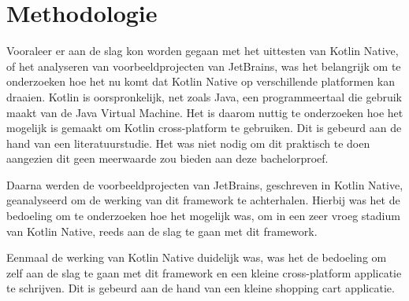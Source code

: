 
\chapter{Methodologie}
\label{ch:methodologie}


Vooraleer er aan de slag kon worden gegaan met het uittesten van Kotlin Native, of het analyseren van voorbeeldprojecten van JetBrains, was het belangrijk om te onderzoeken hoe het nu komt dat Kotlin Native op verschillende platformen kan draaien. Kotlin is oorspronkelijk, net zoals Java, een programmeertaal die gebruik maakt van de Java Virtual Machine. Het is daarom nuttig te onderzoeken hoe het mogelijk is gemaakt om Kotlin cross-platform te gebruiken. Dit is gebeurd aan de hand van een literatuurstudie. Het was niet nodig om dit praktisch te doen aangezien dit geen meerwaarde zou bieden aan deze bachelorproef.

Daarna werden de voorbeeldprojecten van JetBrains, geschreven in Kotlin Native, geanalyseerd om de werking van dit framework te achterhalen. Hierbij was het de bedoeling om te onderzoeken hoe het mogelijk was, om in een zeer vroeg stadium van Kotlin Native, reeds aan de slag te gaan met dit framework. 

Eenmaal de werking van Kotlin Native duidelijk was, was het de bedoeling om zelf aan de slag te gaan met dit framework en een kleine cross-platform applicatie te schrijven. Dit is gebeurd aan de hand van een kleine shopping cart applicatie.

